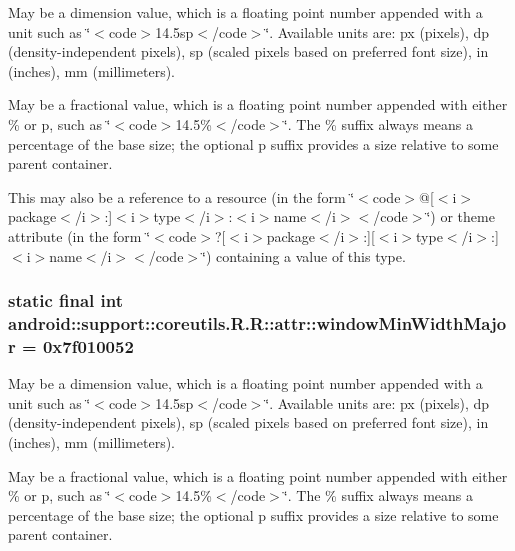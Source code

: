 May be a dimension value, which is a floating point number appended with a unit such as \char`\"{}$<$code$>$14.5sp$<$/code$>$\char`\"{}. Available units are: px (pixels), dp (density-independent pixels), sp (scaled pixels based on preferred font size), in (inches), mm (millimeters). 

May be a fractional value, which is a floating point number appended with either \% or p, such as \char`\"{}$<$code$>$14.5\%$<$/code$>$\char`\"{}. The \% suffix always means a percentage of the base size; the optional p suffix provides a size relative to some parent container. 

This may also be a reference to a resource (in the form \char`\"{}$<$code$>$@\mbox{[}$<$i$>$package$<$/i$>$:\mbox{]}$<$i$>$type$<$/i$>$:$<$i$>$name$<$/i$>$$<$/code$>$\char`\"{}) or theme attribute (in the form \char`\"{}$<$code$>$?\mbox{[}$<$i$>$package$<$/i$>$:\mbox{]}\mbox{[}$<$i$>$type$<$/i$>$:\mbox{]}$<$i$>$name$<$/i$>$$<$/code$>$\char`\"{}) containing a value of this type. \hypertarget{classandroid_1_1support_1_1coreutils_1_1_r_1_1attr_e6339e8edfe091617ca075f3101f10bd}{
\subsubsection[{windowMinWidthMajor}]{\setlength{\rightskip}{0pt plus 5cm}static final int android::support::coreutils.R.R::attr::windowMinWidthMajor = 0x7f010052}}
\label{classandroid_1_1support_1_1coreutils_1_1_r_1_1attr_e6339e8edfe091617ca075f3101f10bd}


May be a dimension value, which is a floating point number appended with a unit such as \char`\"{}$<$code$>$14.5sp$<$/code$>$\char`\"{}. Available units are: px (pixels), dp (density-independent pixels), sp (scaled pixels based on preferred font size), in (inches), mm (millimeters). 

May be a fractional value, which is a floating point number appended with either \% or p, such as \char`\"{}$<$code$>$14.5\%$<$/code$>$\char`\"{}. The \% suffix always means a percentage of the base size; the optional p suffix provides a size relative to some parent container. 

